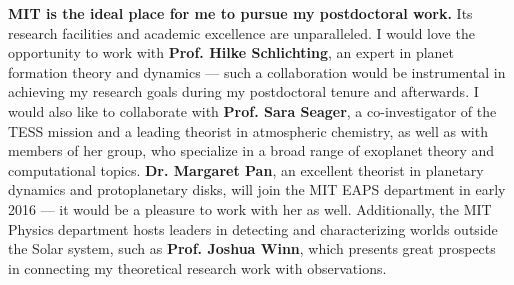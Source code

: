 \documentclass[12pt, letterpaper]{article}
\begin{document}
\textbf{MIT is the ideal place for me to pursue my postdoctoral work.} Its research facilities and academic excellence are unparalleled. I would love the opportunity to work with \textbf{Prof. Hilke Schlichting}, an expert in planet formation theory and dynamics --- such a collaboration would be instrumental in achieving my research goals during my postdoctoral tenure and afterwards. I would also like to collaborate with \textbf{Prof. Sara Seager}, a co-investigator of the TESS mission and a leading theorist in atmospheric chemistry, as well as with members of her group, who specialize in a broad range of exoplanet theory and computational topics. \textbf{Dr. Margaret Pan}, an excellent theorist in planetary dynamics and protoplanetary disks, will join the MIT EAPS department in early 2016 --- it would be a pleasure to work with her as well. Additionally, the MIT Physics department hosts leaders in detecting and characterizing worlds outside the Solar system, such as \textbf{Prof. Joshua Winn}, which presents great prospects in connecting my theoretical research work with observations. \\



\end{document}

